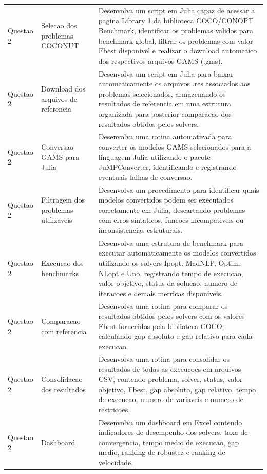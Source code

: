 \documentclass[12pt,a4paper]{article}
\begin{document}
\begin{longtable}{p{2.2cm}p{3.8cm}p{8.6cm}}
Questao 2 & Selecao dos problemas COCONUT &
Desenvolva um script em Julia capaz de acessar a pagina Library 1 da biblioteca COCO/CONOPT Benchmark, identificar os problemas validos para benchmark global, filtrar os problemas com valor Fbest disponivel e realizar o download automatico dos respectivos arquivos GAMS (.gms). \\

Questao 2 & Download dos arquivos de referencia &
Desenvolva um script em Julia para baixar automaticamente os arquivos .res associados aos problemas selecionados, armazenando os resultados de referencia em uma estrutura organizada para posterior comparacao dos resultados obtidos pelos solvers. \\

Questao 2 & Conversao GAMS para Julia &
Desenvolva uma rotina automatizada para converter os modelos GAMS selecionados para a linguagem Julia utilizando o pacote JuMPConverter, identificando e registrando eventuais falhas de conversao. \\

Questao 2 & Filtragem dos problemas utilizaveis &
Desenvolva um procedimento para identificar quais modelos convertidos podem ser executados corretamente em Julia, descartando problemas com erros sintaticos, funcoes incompativeis ou inconsistencias estruturais. \\

Questao 2 & Execucao dos benchmarks &
Desenvolva uma estrutura de benchmark para executar automaticamente os modelos convertidos utilizando os solvers Ipopt, MadNLP, Optim, NLopt e Uno, registrando tempo de execucao, valor objetivo, status da solucao, numero de iteracoes e demais metricas disponiveis. \\

Questao 2 & Comparacao com referencia &
Desenvolva uma rotina para comparar os resultados obtidos pelos solvers com os valores Fbest fornecidos pela biblioteca COCO, calculando gap absoluto e gap relativo para cada execucao. \\

Questao 2 & Consolidacao dos resultados &
Desenvolva uma rotina para consolidar os resultados de todas as execucoes em arquivos CSV, contendo problema, solver, status, valor objetivo, Fbest, gap absoluto, gap relativo, tempo de execucao, numero de variaveis e numero de restricoes. \\

Questao 2 & Dashboard &
Desenvolva um dashboard em Excel contendo indicadores de desempenho dos solvers, taxa de convergencia, tempo medio de execucao, gap medio, ranking de robustez e ranking de velocidade. \\


\end{longtable}
\end{document}
